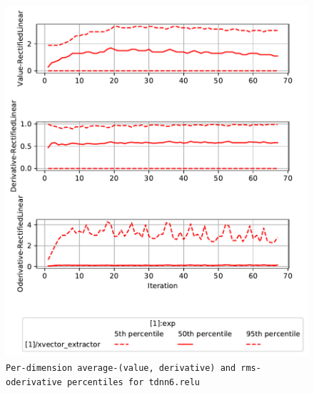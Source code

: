 \documentclass[prl,10pt,twocolumn]{revtex4}
\begin{document}
\newpage
\begin{figure}[h]
  \begin{center}
    \caption{\texttt{Per-dimension average-(value, derivative) and rms-oderivative percentiles for tdnn6.relu}}
    \includegraphics[width=\textwidth]{exp/xvector_extractor/report/nonlinstats_tdnn6_dot_relu.pdf}
  \end{center}
\end{figure}
\clearpage
\end{document}
